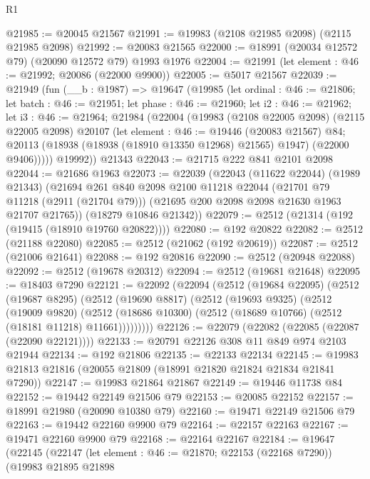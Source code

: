 \begin{lexlean}{R1}
\begin{coremodule}
@21985 := @20045 @21567
@21991 := @19983 (@2108 @21985 @2098) (@2115 @21985 @2098)
@21992 := @20083 @21565
@22000 := @18991 (@20034 @12572 @79) (@20090 @12572 @79) @1993 @1976
@22004 := @21991 (let element : @46 := @21992; @20086 (@22000 @9900))
@22005 := @5017 @21567
@22039 := @21949
    (fun (__b : @1987) =>
    @19647
      (@19985
        (let ordinal : @46 := @21806;
        let batch : @46 := @21951;
        let phase : @46 := @21960;
        let i2 : @46 := @21962;
        let i3 : @46 := @21964;
        @21984
          (@22004
            (@19983
              (@2108 @22005 @2098)
              (@2115 @22005 @2098)
              @20107
              (let element : @46 := @19446 (@20083 @21567) @84;
              @20113 (@18938 (@18938 (@18910 @13350 @12968) @21565) @1947) (@22000 @9406)))))
        @19992))
    @21343
@22043 := @21715 @222 @841 @2101 @2098
@22044 := @21686 @1963
@22073 := @22039
    (@22043
      (@11622 @22044)
      (@1989 @21343)
      (@21694
        @261
        @840
        @2098
        @2100
        @11218
        @22044
        (@21701 @79 @11218 (@2911 (@21704 @79)))
        (@21695 @200 @2098 @2098 @21630 @1963 @21707 @21765))
      (@18279 @10846 @21342))
@22079 := @2512 (@21314 (@192 (@19415 (@18910 @19760 @20822))))
@22080 := @192 @20822
@22082 := @2512 (@21188 @22080)
@22085 := @2512 (@21062 (@192 @20619))
@22087 := @2512 (@21006 @21641)
@22088 := @192 @20816
@22090 := @2512 (@20948 @22088)
@22092 := @2512 (@19678 @20312)
@22094 := @2512 (@19681 @21648)
@22095 := @18403 @7290
@22121 := @22092
    (@22094
      (@2512
        (@19684 @22095)
        (@2512
          (@19687 @8295)
          (@2512
            (@19690 @8817)
            (@2512
              (@19693 @9325)
              (@2512
                (@19009 @9820)
                (@2512 (@18686 @10300) (@2512 (@18689 @10766) (@2512 (@18181 @11218) @11661)))))))))
@22126 := @22079 (@22082 (@22085 (@22087 (@22090 @22121))))
@22133 := @20791 @22126 @308 @11 @849 @974 @2103 @21944
@22134 := @192 @21806
@22135 := @22133 @22134
@22145 := @19983 @21813 @21816 (@20055 @21809 (@18991 @21820 @21824 @21834 @21841 @7290))
@22147 := @19983 @21864 @21867
@22149 := @19446 @11738 @84
@22152 := @19442 @22149 @21506 @79
@22153 := @20085 @22152
@22157 := @18991 @21980 (@20090 @10380 @79)
@22160 := @19471 @22149 @21506 @79
@22163 := @19442 @22160 @9900 @79
@22164 := @22157 @22163
@22167 := @19471 @22160 @9900 @79
@22168 := @22164 @22167
@22184 := @19647
    (@22145
      (@22147
        (let element : @46 := @21870; @22153 (@22168 @7290))
        (@19983
          @21895
          @21898

\end{coremodule}
\end{lexlean}
